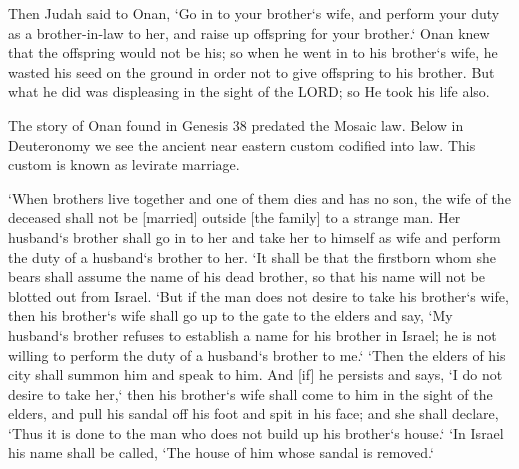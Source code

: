 \vspace{2\baselineskip}

\begin{scripture}[Genesis 38:8-10]
    Then Judah said to Onan, `Go in to your brother`s wife, 
     and perform your duty as a brother-in-law to her, and raise up offspring for your brother.`
    Onan knew that the offspring would not be his; so when he went in to his brother`s wife, he wasted his seed on the ground in order not to give offspring to his brother.  
    But what he did was displeasing in the sight of the LORD; so He took his life also.
\end{scripture}

\vspace{3\baselineskip}

\begin{fullwidth}
The story of Onan found in Genesis 38 predated the Mosaic law. Below in Deuteronomy we see the ancient near eastern custom codified into law. This custom is known as levirate marriage. 
\end{fullwidth}


\vspace{2\baselineskip}

\begin{scripture}[Deuteronomy 25:5-10]
    `When brothers live together and one of them dies and has no son, 
    the wife of the deceased shall not be [married] outside [the family] to a strange man. Her husband`s brother shall go in to her and take her to himself as wife and perform the duty of a husband`s brother to her.
    `It shall be that the firstborn whom she bears shall assume the name of his dead brother, so that his name will not be blotted out from Israel. 
    `But if the man does not desire to take his brother`s wife, then his brother`s wife shall  
    go up to the gate to the elders and say, `My husband`s brother refuses to establish a name for his brother in Israel; he is not willing to perform the duty of a husband`s brother to me.`
    `Then the elders of his city shall summon him and speak to him. And [if] he persists and says, `I do not desire to take her,`
    then his brother`s wife shall come to him in the sight of the elders, and pull his sandal off his foot and spit in his face; and she shall declare, `Thus it is done to the man who does not build up his brother`s house.`
    `In Israel his name shall be called, `The house of him whose sandal is removed.`
\end{scripture}

